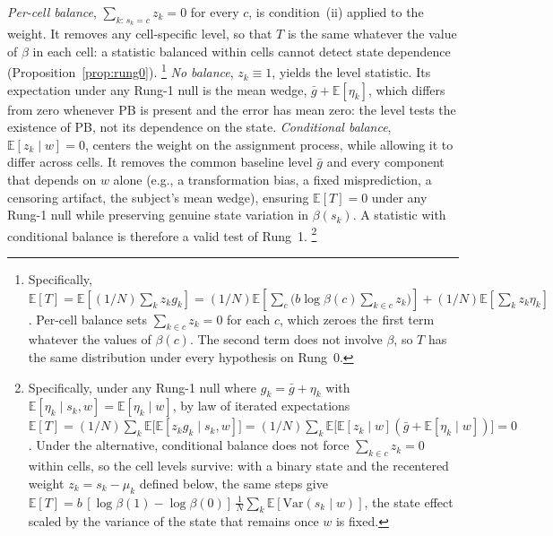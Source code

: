\documentclass[11pt,a4paper]{article}
\theoremstyle{plain}
\theoremstyle{definition}
\newcommand{\E}{\mathbb{E}}
\newcommand{\Var}{\mathrm{Var}}
\begin{document}
\emph{Per-cell balance}, $\sum_{k:\,s_k=c}z_k=0$ for every $c$, is condition~(ii) applied to the weight. It removes any cell-specific level, so that $T$ is the same whatever the value of $\beta$ in each cell: a statistic balanced within cells cannot detect state dependence (Proposition~\ref{prop:rung0}).%
\footnote{Specifically, $\mathbb{E}[T] = \mathbb{E}\left[ (1/N) \sum_k z_k g_k \right] = (1/N) \mathbb{E}\left[ \sum_c \bigl( b \log \beta(c) \sum_{k \in c} z_k \bigr) \right] + (1/N) \mathbb{E}\left[ \sum_k z_k \eta_k \right]$. Per-cell balance sets $\sum_{k \in c} z_k = 0$ for each $c$, which zeroes the first term whatever the values of $\beta(c)$. The second term does not involve $\beta$, so $T$ has the same distribution under every hypothesis on Rung~0.}
\emph{No balance}, $z_k\equiv1$, yields the level statistic. Its expectation under any Rung-1 null is the mean wedge, $\bar g+\E[\eta_k]$, which differs from zero whenever PB is present and the error has mean zero: the level tests the existence of PB, not its dependence on the state.
\emph{Conditional balance}, $\mathbb{E}[z_k \mid w] = 0$, centers the weight on the assignment process, %
while allowing it to differ across cells. It removes the common baseline level $\bar{g}$ and every component that depends on $w$ alone (e.g., a %
transformation bias, a fixed misprediction, a censoring artifact, the subject's mean wedge), ensuring $\mathbb{E}[T]=0$ under any Rung-1 null while preserving genuine state variation in $\beta(s_k)$. A statistic with conditional balance is therefore a valid test of Rung~1.%
\footnote{Specifically, under any Rung-1 null where $g_k = \bar{g} + \eta_k$ with $\mathbb{E}[\eta_k \mid s_k, w] = \mathbb{E}[\eta_k \mid w]$, by law of iterated expectations $\mathbb{E}[T] = (1/N) \sum_k \mathbb{E}\bigl[ \mathbb{E}[z_k g_k \mid s_k, w] \bigr] = (1/N) \sum_k \mathbb{E}\bigl[ \mathbb{E}[z_k \mid w] (\bar{g} + \mathbb{E}[\eta_k \mid w]) \bigr] = 0$. Under the alternative, conditional balance does not force $\sum_{k\in c}z_k=0$ within cells, so the cell levels survive: with a binary state and the recentered weight $z_k=s_k-\mu_k$ defined below, the same steps give $\E[T]=b\,[\log\beta(1)-\log\beta(0)]\,\frac1N\sum_k\E[\Var(s_k\mid w)]$, the state effect scaled by the variance of the state that remains once $w$ is fixed.}
\end{document}
